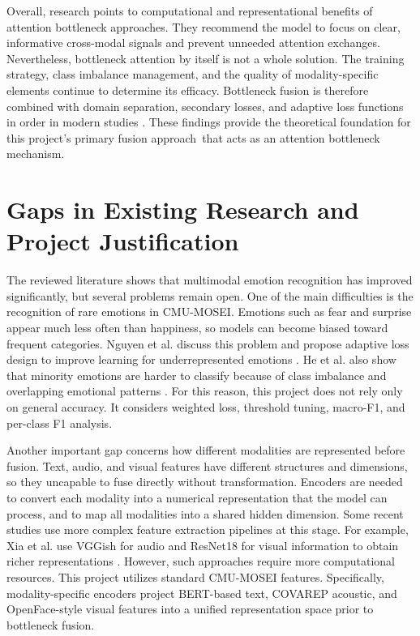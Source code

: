 Overall, research points to computational and representational benefits of attention bottleneck approaches.   They recommend the model to focus on clear, informative cross-modal signals and prevent unneeded attention exchanges. Nevertheless, bottleneck attention by itself is not a whole solution. The training strategy, class imbalance management, and the quality of modality-specific elements continue to determine its efficacy. Bottleneck fusion is therefore combined with domain separation, secondary losses, and adaptive loss functions in order in modern studies \cite{he2024domain,nguyen2025enhanced}. These findings provide the theoretical foundation for this project's primary fusion approach that acts as an attention bottleneck mechanism.

\section{Gaps in Existing Research and Project Justification}

The reviewed literature shows that multimodal emotion recognition has improved significantly, but several problems remain open. One of the main difficulties is the recognition of rare emotions in CMU-MOSEI. Emotions such as fear and surprise appear much less often than happiness, so models can become biased toward frequent categories. Nguyen et al. discuss this problem and propose adaptive loss design to improve learning for underrepresented emotions \cite{nguyen2025enhanced}. He et al. also show that minority emotions are harder to classify because of class imbalance and overlapping emotional patterns \cite{he2024domain}. For this reason, this project does not rely only on general accuracy. It considers weighted loss, threshold tuning, macro-F1, and per-class F1 analysis.

Another important gap concerns how different modalities are represented before fusion. Text, audio, and visual features have different structures and dimensions, so they uncapable to fuse directly without transformation. Encoders are needed to convert each modality into a numerical representation that the model can process, and to map all modalities into a shared hidden dimension. Some recent studies use more complex feature extraction pipelines at this stage. For example, Xia et al. use VGGish for audio and ResNet18 for visual information to obtain richer representations \cite{xia2022multimodal}. However, such approaches require more computational resources. This project utilizes standard CMU-MOSEI features. Specifically, modality-specific encoders project BERT-based text, COVAREP acoustic, and OpenFace-style visual features into a unified representation space prior to bottleneck fusion.

